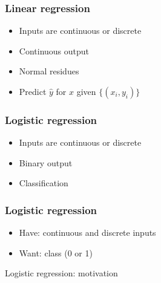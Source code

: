 \begin{frame}
\end{frame}

\begin{frame}
  \frametitle{Linear regression}
  \begin{bphrase}
    \begin{itemize}
    \item Inputs are continuous or discrete
    \item Continuous output
    \item Normal residues
    \item Predict $\hat{y}$ for $x$ given $\{(x_i, y_i)\}$
    \end{itemize}
  \end{bphrase}
\end{frame}

\begin{frame}
  \frametitle{Logistic regression}
  \begin{bphrase}
    \begin{itemize}
    \item Inputs are continuous or discrete
    \item Binary output
    \item Classification
    \end{itemize}
  \end{bphrase}
\end{frame}

\begin{frame}
  \frametitle{Logistic regression}
  \begin{itemize}
  \item Have: continuous and discrete inputs
  \item Want: class (0 or 1)
  \end{itemize}
\end{frame}

\begin{frame}{Logistic regression: motivation}
\end{frame}

